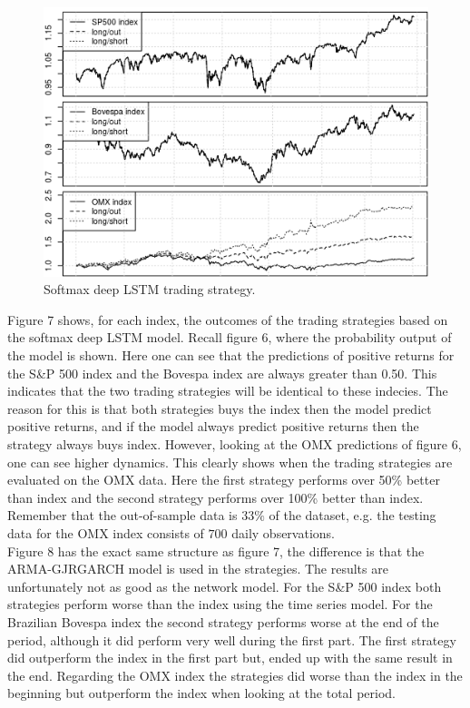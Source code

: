 \documentclass[12pt, letterpaper]{amsart}%
\begin{document}
\begin{figure}[H]
\caption{Softmax deep LSTM trading strategy.}
\centering
\includegraphics[scale=0.8]{strategy.png}
\end{figure}
Figure 7 shows, for each index, the outcomes of the trading strategies based on the softmax deep LSTM model. Recall figure 6, where the probability output of the model is shown. Here one can see that the predictions of positive returns for the S\&P 500 index and the Bovespa index are always greater than 0.50. This indicates that the two trading strategies will be identical to these indecies. The reason for this is that both strategies buys the index then the model predict positive returns, and if the model always predict positive returns then the strategy always buys index. However, looking at the OMX predictions of figure 6, one can see higher dynamics. This clearly shows when the trading strategies are evaluated on the OMX data. Here the first strategy performs over 50\% better than index and the second strategy performs over 100\% better than index. Remember that the out-of-sample data is $33\%$ of the dataset, e.g. the testing data for the OMX index consists of $700$ daily observations.
\\

Figure 8 has the exact same structure as figure 7, the difference is that the ARMA-GJRGARCH model is used in the strategies. The results are unfortunately not as good as the network model. For the S\&P 500 index both strategies perform worse than the index using the time series model. For the Brazilian Bovespa index the second strategy performs worse at the end of the period, although it did perform very well during the first part. The first strategy did outperform the index in the first part but, ended up with the same result in the end. Regarding the OMX index the strategies did worse than the index in the beginning but outperform the index when looking at the total period.
\end{document}
